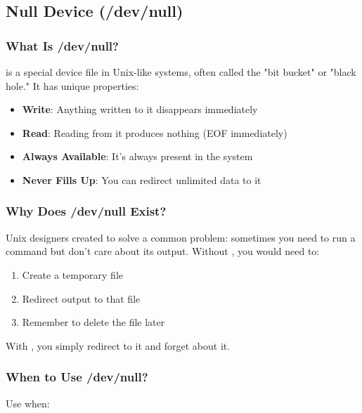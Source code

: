\subsection{Null Device (/dev/null)}

\subsubsection{What Is /dev/null?}

 is a special device file in Unix-like systems, often called the "bit bucket" or "black hole." It has unique properties:

\begin{itemize}
	\item \textbf{Write}: Anything written to it disappears immediately
	\item \textbf{Read}: Reading from it produces nothing (EOF immediately)
	\item \textbf{Always Available}: It's always present in the system
	\item \textbf{Never Fills Up}: You can redirect unlimited data to it
\end{itemize}

\subsubsection{Why Does /dev/null Exist?}

Unix designers created  to solve a common problem: sometimes you need to run a command but don't care about its output. Without , you would need to:
\begin{enumerate}
	\item Create a temporary file
	\item Redirect output to that file
	\item Remember to delete the file later
\end{enumerate}

With , you simply redirect to it and forget about it.

\subsubsection{When to Use /dev/null?}

Use  when:

